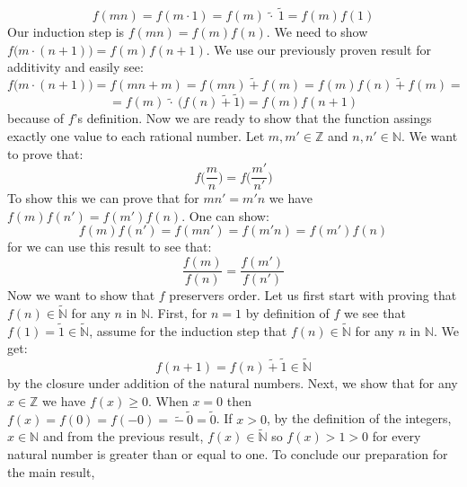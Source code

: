 \documentclass{article}
\begin{document}
\begin{equation*}
    f(mn) = f(m \cdot 1) = f(m) \ \tilde{\cdot} \ \tilde{1} = f(m)f(1)
\end{equation*}
Our induction step is \(f(mn) = f(m)f(n)\). We need to show \(f\Big(m \cdot (n + 1)\Big) = f(m)f(n+1)\). We use our
previously proven result for additivity and easily see:
\begin{equation*}
    f\Big(m \cdot (n + 1)\Big) = f(mn + m) = f(mn) \ \tilde{+} \ f(m) = f(m)f(n) \ \tilde{+} \ f(m) = 
\end{equation*}
\begin{equation*}
    = f(m) \ \tilde{\cdot} \ \Big(f(n) \ \tilde{+} \ \tilde{1}\Big) = f(m)f(n+1)
\end{equation*}
because of \(f\)'s definition. Now we are ready to show that the function assings exactly one value to each rational number.
Let \(m, m' \in \mathbb{Z}\) and \(n, n' \in \mathbb{N}\). We want to prove that:
\begin{equation*}
    f\Big(\frac{m}{n}\Big) = f\Big(\frac{m'}{n'}\Big)
\end{equation*}
To show this we can prove that for \(mn' = m'n\) we have \(f(m)f(n') = f(m')f(n)\). One can show:
\begin{equation*}
    f(m)f(n') = f(mn') = f(m'n) = f(m')f(n)
\end{equation*}
for we can use this result to see that:
\begin{equation*}
    \frac{f(m)}{f(n)} = \frac{f(m')}{f(n')}
\end{equation*}
Now we want to show that \(f\) preservers order. Let us first start with proving that \(f(n) \in \tilde{\mathbb{N}}\) for
any \(n\) in \(\mathbb{N}\). First, for \(n = 1\) by definition of \(f\) we see that \(f(1) = \tilde{1} \in \tilde{\mathbb{N}}\),
assume for the induction step that \(f(n) \in \tilde{\mathbb{N}}\) for
any \(n\) in \(\mathbb{N}\). We get:
\begin{equation*}
    f(n + 1) = f(n) \ \tilde{+} \ \tilde{1} \in \tilde{\mathbb{N}}
\end{equation*}
by the closure under addition of the natural numbers. Next, we show that for any \(x \in \mathbb{Z}\) we have
\(f(x) \geq 0\). When \(x = 0\) then \(f(x) = f(0) = f(-0) = \ \tilde{-} \ \tilde{0} = \tilde{0}\). If \(x > 0\), by the 
definition of the integers, \(x \in \mathbb{N}\) and from the previous result, \(f(x) \in \tilde{\mathbb{N}}\)
so \(f(x) > 1 > 0\) for every natural number is greater than or equal to one. To conclude our preparation for the main result,
\end{document}
